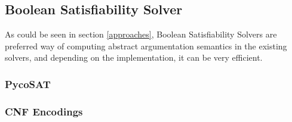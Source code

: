 \subsection{Boolean Satisfiability Solver}
As could be seen in section \ref{approaches}, Boolean Satisfiability Solvers are preferred way of computing abstract argumentation semantics in the existing solvers, and depending on the implementation, it can be very efficient. 

\subsubsection{PycoSAT}
\subsubsection{CNF Encodings}